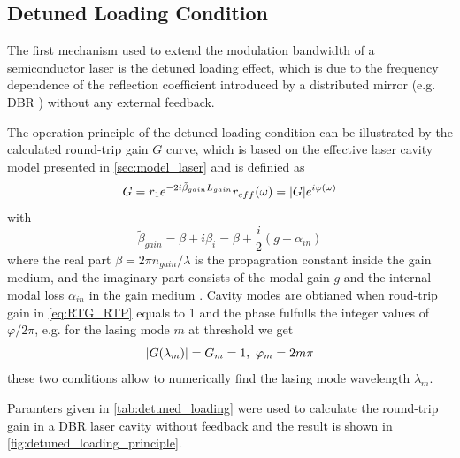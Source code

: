 \subsection{Detuned Loading Condition}\label{subsec:detuned_loading}
The first mechanism used to extend the modulation bandwidth of a semiconductor laser is the detuned loading effect, which is due to the frequency dependence of the reflection coefficient introduced by a distributed mirror (e.g. DBR \cite{feiste1998optimization, kjebon1997two, chacinski2010impact}) without any external feedback. 

The operation principle of the detuned loading condition can be illustrated by the calculated round-trip gain $G$ curve, which is based on the effective laser cavity model presented in \autoref{sec:model_laser} and is definied as \cite{petermann2012laser, vallone2011enhanced}
\begin{equation}
    G=r_1e^{-2i\tilde{\beta}_{gain}L_{gain}}r_{eff}(\omega)=\abs{G}e^{i\varphi(\omega)}
    \label{eq:RTG_RTP}
\end{equation}
with \cite{coldren2012diode}
\begin{equation}
    \tilde{\beta}_{gain}=\beta+i\beta_{i}=\beta+\frac{i}{2}(g-\alpha_{in})
    \label{eq:beta_gain}
\end{equation}
where the real part $\beta=2\pi n_{gain}/\lambda$ is the propagration constant inside the gain medium, and the imaginary part consists of the modal gain $g$ and the internal modal loss $\alpha_{in}$ in the gain medium \cite{coldren2012diode}. Cavity modes are obtianed when roud-trip gain in \autoref{eq:RTG_RTP} equals to 1 and the phase fulfulls the integer values of $\varphi/2\pi$, e.g. for the lasing mode $m$ at threshold we get \cite{vallone2011enhanced}
\begin{equation}
    \abs{G(\lambda_m)}=G_m=1,\ \varphi_m=2m\pi
    \label{eq:lasing_condition}
\end{equation}
these two conditions allow to numerically find the lasing mode wavelength $\lambda_m$.

Paramters given in \autoref{tab:detuned_loading} were used to calculate the round-trip gain in a DBR laser cavity without feedback and the result is shown in \autoref{fig:detuned_loading_principle}.

